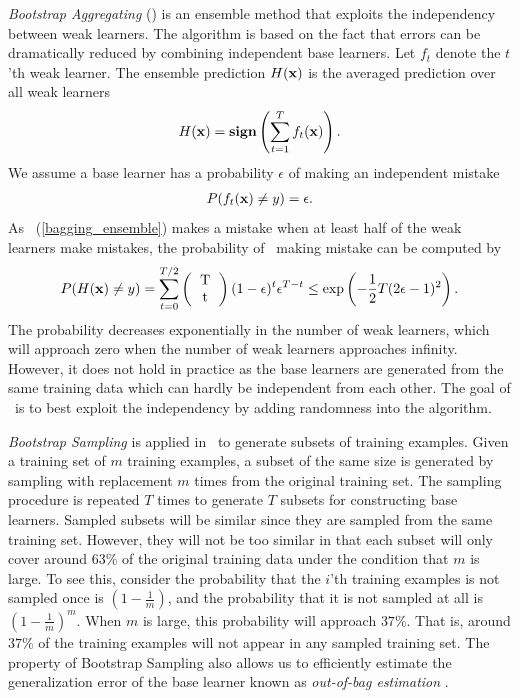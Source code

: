 {\textit{Bootstrap Aggregating} (\bagging) \citep{Breiman96bagging} is an ensemble method that exploits the independency between weak learners.
The algorithm is based on the fact that errors can be dramatically reduced by combining independent base learners.
Let $f_t$ denote the $t$'th weak learner.
The ensemble prediction $H(\mathbf {x})$ is the averaged prediction over all weak learners
\begin{align}
	H(\mathbf {x}) = \textbf{sign}\left(\sum_{t=1}^{T}f_t(\mathbf {x})\right). \label{bagging_ensemble}
\end{align}
We assume a base learner has a probability $\epsilon$ of making an independent mistake
\begin{align*}
	P(f_t(\mathbf {x}) \ne y) = \epsilon.
\end{align*}
As \bagging\ (\ref{bagging_ensemble}) makes a mistake when at least half of the weak learners make mistakes, the probability of \bagging\ making mistake can be computed by
\begin{align*}
	P(H(\vx)\neq y) = \sum_{t=0}^{T/2}\left(\begin{tabular}{cc}T\\t\end{tabular}\right)(1-\epsilon)^t\epsilon^{T-t} \le\exp\left(-\frac{1}{2}T(2\epsilon-1)^2\right).
\end{align*}
The probability decreases exponentially in the number of weak learners, which will approach zero when the number of weak learners approaches infinity.
However, it does not hold in practice as the base learners are generated from the same training data which can hardly be independent from each other.
The goal of \bagging\ is to best exploit the independency by adding randomness into the algorithm.

\textit{Bootstrap Sampling} \citep{Efron1994introduction} is applied in \bagging\ to generate subsets of training examples.
Given a training set of $m$ training examples, a subset of the same size is generated by sampling with replacement $m$ times from the original training set.
The sampling procedure is repeated $T$ times to generate $T$ subsets for constructing base learners.
Sampled subsets will be similar since they are sampled from the same training set.
However, they will not be too similar in that each subset will only cover around $63\%$ of the original training data under the condition that $m$ is large.
To see this, consider the probability that the $i$'th training examples is not sampled once is $(1-\frac{1}{m})$, and the probability that it is not sampled at all is $(1-\frac{1}{m})^m$.
When $m$ is large, this probability will approach $37\%$. 
That is, around $37\%$ of the training examples will not appear in any sampled training set.
The property of Bootstrap Sampling also allows us to efficiently estimate the generalization error of the base learner known as \textit{out-of-bag estimation} \citep{Breiman96out,Tibshirani1996bias,Wolpert99an}.

}

